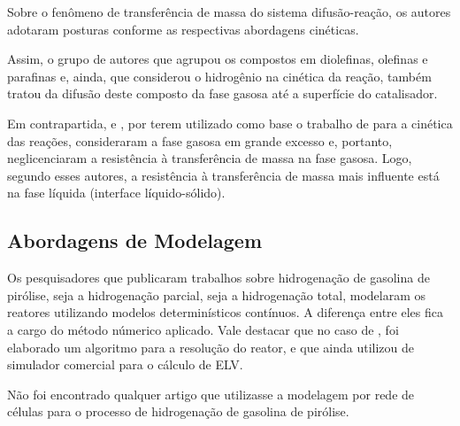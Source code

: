 Sobre o fenômeno de transferência de massa do sistema difusão-reação, 
os autores adotaram posturas conforme as respectivas abordagens cinéticas.

Assim, o grupo de autores que agrupou os compostos em diolefinas, olefinas e
parafinas \cite{Arpornwichanop2002, Authayanun2008} e, ainda, que considerou o
hidrogênio na cinética da reação, também tratou da difusão deste composto da
fase gasosa até a superfície do catalisador. 

Em contrapartida,  e , por
terem utilizado como base o trabalho de  para a cinética
das reações, consideraram a fase gasosa em grande excesso e, portanto,
neglicenciaram a resistência à transferência de massa na fase gasosa.
Logo, segundo esses autores, a resistência à transferência de massa
mais influente está na fase líquida (interface líquido-sólido).

\subsection{Abordagens de Modelagem} \label{sec:abordagensmodelagem}

Os pesquisadores que publicaram trabalhos sobre hidrogenação de gasolina
de pirólise, seja a hidrogenação parcial, seja a hidrogenação total, modelaram
os reatores utilizando modelos determinísticos contínuos. A diferença entre
eles fica a cargo do método númerico aplicado. Vale destacar que no caso de
, foi elaborado um algoritmo para a resolução
do reator, e que ainda utilizou de simulador comercial para o cálculo de ELV.

Não foi encontrado qualquer artigo que utilizasse a modelagem por rede de
células para o processo de hidrogenação de gasolina de pirólise.


